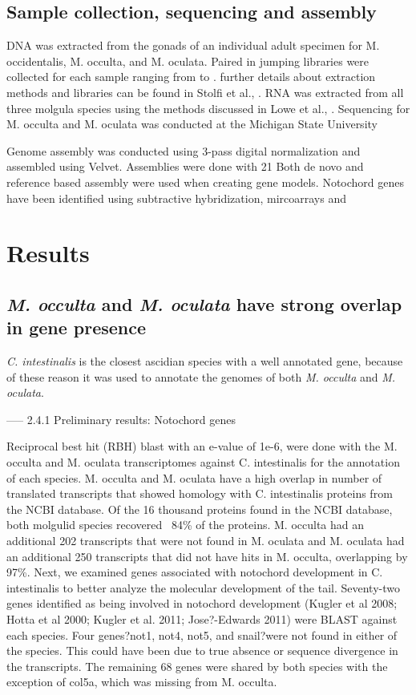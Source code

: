 \subsection{Sample collection, sequencing and assembly}
DNA was extracted from the gonads of an individual adult specimen for M. occidentalis, M. occulta, and M. oculata. Paired in jumping libraries were collected for each sample ranging from  to . further details about extraction methods and libraries can be found in Stolfi et al., \cite{}. RNA was extracted from all three molgula species using the methods discussed in Lowe et al., \cite{}. Sequencing for M. occulta and M. oculata was conducted at the Michigan State University 

Genome assembly was conducted using 3-pass digital normalization\cite{} and assembled using Velvet\cite{}. Assemblies were done with 21 
Both de novo and reference based assembly were used when creating gene models. 
Notochord genes have been identified using subtractive hybridization, mircoarrays and 

\section{Results}
\subsection{\textit{M. occulta} and \textit{M. oculata} have strong overlap in gene presence}
\textit{C. intestinalis} is the closest ascidian species with a well annotated gene, because of these reason it was used to annotate the genomes of both \textit{M. occulta} and \textit{M. oculata}. 

-----
2.4.1 Preliminary results: Notochord genes

Reciprocal best hit (RBH) blast with an e-value of 1e-6, were done with the M. occulta and M. oculata transcriptomes against C. intestinalis for the annotation of each species. M. occulta and M. oculata have a high overlap in number of translated transcripts that showed homology with C. intestinalis proteins from the NCBI database. Of the 16 thousand proteins found in the NCBI database, both molgulid species recovered  ~84\% of the proteins. M. occulta had an additional 202 transcripts that were not found in M. oculata and M. oculata had an additional 250 transcripts that did not have hits in M. occulta, overlapping by 97\%. Next, we examined genes associated with notochord development in C. intestinalis to better analyze the molecular development of the tail.  Seventy-two genes identified as being involved in notochord development (Kugler et al 2008; Hotta et al 2000; Kugler et al. 2011; Jose?-Edwards 2011) were BLAST against each species. Four genes?not1, not4, not5, and snail?were not found in either of the species. This could have been due to true absence or sequence divergence in the transcripts. The remaining 68 genes were shared by both species with the exception of col5a, which was missing from M. occulta.

